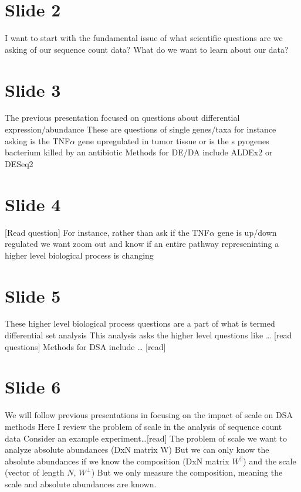 \documentclass[11pt]{article}
\author{hh}
\date{\today}
\title{}
\begin{document}
\section{Slide 2}
\label{sec:org7a59a77}

I want to start with the fundamental issue of what scientific questions are we asking of our sequence count data?
What do we want to learn about our data?

\section{Slide 3}
\label{sec:orgf021f87}

The previous presentation focused on questions about differential expression/abundance
These are questions of single genes/taxa
for instance asking is the TNF\(\alpha\) gene upregulated in tumor tissue or is the s pyogenes bacterium killed by an antibiotic
Methods for DE/DA include ALDEx2 or DESeq2

\section{Slide 4}
\label{sec:org762f878}

[Read question]
For instance, rather than ask if the TNF\(\alpha\) gene is up/down regulated we want zoom out and know if an entire pathway represeninting a higher level
biological process is changing

\section{Slide 5}
\label{sec:org8b9bff4}

These higher level biological process questions are a part of what is termed differential set analysis
This analysis asks the higher level questions like \ldots{} [read questions]
Methods for DSA include \ldots{} [read]

\section{Slide 6}
\label{sec:org000332f}

We will follow previous presentations in focusing on the impact of scale on DSA methods
Here I review the problem of scale in the analysis of sequence count data
Consider an example experiment\ldots{}[read]
The problem of scale we want to analyze absolute abundances (DxN matrix W)
But we can only know the absolute abundances if we know the composition (DxN matrix \(W^\parallel\)) and the scale (vector of length \(N\), \(W^\perp\))
But we only measure the composition, meaning the scale and absolute abundances are known.
\end{document}
